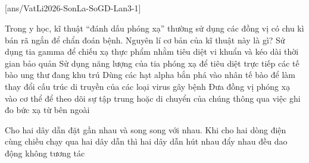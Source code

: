 \def\CheDo{solcolor}%
\def\tenchuong{Sở GD\&ĐT Sơn La -- Lần 3}
\def\thuonghieu{VẬT LÍ 12 -- Eduzy.com.vn}
\def\TachCauDS{1}
\def\TachCauLG{1}




	\noindent
	\subsection*{}
	\setcounter{ex}{0}
	[ans/VatLi2026-SonLa-SoGD-Lan3-1]

	\begin{ex}%
		Trong y học, kĩ thuật ``đánh dấu phóng xạ'' thường sử dụng các đồng vị có chu kì bán rã ngắn để chẩn đoán bệnh. Nguyên lí cơ bản của kĩ thuật này là gì?
		\choice
		{Sử dụng tia gamma để chiếu xạ thực phẩm nhằm tiêu diệt vi khuẩn và kéo dài thời gian bảo quản}
		{Sử dụng năng lượng của tia phóng xạ để tiêu diệt trực tiếp các tế bào ung thư đang khu trú}
		{Dùng các hạt alpha bắn phá vào nhân tế bào để làm thay đổi cấu trúc di truyền của các loại virus gây bệnh}
		{\True Đưa đồng vị phóng xạ vào cơ thể để theo dõi sự tập trung hoặc di chuyển của chúng thông qua việc ghi đo bức xạ từ bên ngoài}
	\end{ex}

	\begin{ex}%
		Cho hai dây dẫn đặt gần nhau và song song với nhau. Khi cho hai dòng điện cùng chiều chạy qua hai dây dẫn thì hai dây dẫn
		\choice
		{\True hút nhau}
		{đẩy nhau}
		{đều dao động}
		{không tương tác}
	\end{ex}

